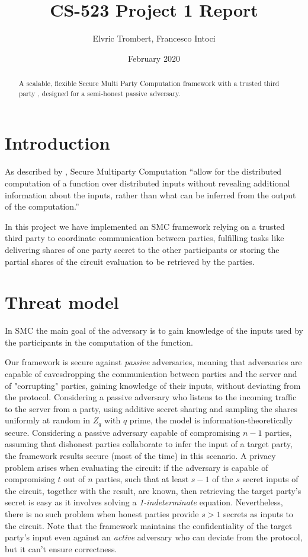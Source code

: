 \documentclass[10pt,conference,compsocconf]{IEEEtran}
\title{CS-523 Project 1 Report}
\author{Elvric Trombert, Francesco Intoci}
\date{February 2020}
\begin{document}
\maketitle

\begin{abstract}
    A scalable, flexible Secure Multi Party Computation framework with a trusted third party , designed for a semi-honest passive adversary.
\end{abstract}

\section{Introduction}
As described by \cite[Frikken]{Frikken2011}, Secure Multiparty Computation \enquote{allow for the distributed computation of a
function over distributed inputs without revealing additional information about the inputs, rather than what can be inferred from the output of the computation.}

In this project we have implemented an SMC framework relying on a trusted third party to coordinate communication between
parties, fulfilling tasks like delivering shares of one party secret to the other participants or storing the partial shares
of the circuit evaluation to be retrieved by the parties.

\section{Threat model}
In SMC the main goal of the adversary is to gain knowledge of the inputs used by the participants in the computation of
the function.

Our framework is secure against \textit{passive} adversaries, meaning that adversaries are capable of eavesdropping
the communication between parties and the server and of "corrupting" parties, gaining knowledge of their inputs, without deviating from the protocol.
Considering a passive adversary who listens to the incoming traffic to the server from a party, using additive secret
sharing and sampling the shares uniformly at random in $Z_q$ with $q$ prime, the model is information-theoretically secure.
Considering a passive adversary capable of compromising $n-1$ parties, assuming that dishonest parties collaborate to
infer the input of a target party, the framework results secure (most of the time) in this scenario.
A privacy problem arises when evaluating the circuit: if the adversary is capable of compromising $t$ out of $n$ parties,
such that at least $s-1$ of the $s$ secret inputs of the circuit, together with the result, are known, then retrieving the
target party's secret is easy as it involves solving a \textit{1-indeterminate} equation.
Nevertheless, there is no such problem when honest parties provide $s > 1$ secrets as inputs to the circuit.
Note that the framework maintains the confidentiality of the target party's input even against an
\textit{active} adversary who can deviate from the protocol, but it can't ensure correctness.
\end{document}
